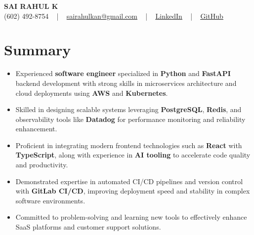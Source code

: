\documentclass[letterpaper,11pt]{article}
\newcommand{\resumeItem}[1]{
  \item\footnotesize{
    {#1 \vspace{-2pt}}
  }
}
\newcommand{\resumeItemListStart}{\begin{itemize}[leftmargin=*]}
\newcommand{\resumeItemListEnd}{\end{itemize}\vspace{-5pt}}
\begin{document}
\begin{center}
    {\fontsize{14pt}{12pt}\selectfont \textbf{\MakeUppercase{Sai Rahul K}}}\\ \vspace{2pt}
    \fontsize{10pt}{12pt}\selectfont (602) 492-8754 ~ | ~ \href{mailto:sairahulkan@gmail.com}{sairahulkan@gmail.com} ~ | ~
    \href{https://www.linkedin.com/in/rq123/}{\color{blue}\underline{LinkedIn}} ~ | ~
    \href{https://github.com/kanrahuldo}{\color{blue}\underline{GitHub}}~
    \vspace{-8pt}
\end{center}

\section{Summary}
\fontsize{9pt}{10pt}\selectfont
\resumeItemListStart
    \resumeItem{Experienced \textbf{software engineer} specialized in \textbf{Python} and \textbf{FastAPI} backend development with strong skills in microservices architecture and cloud deployments using \textbf{AWS} and \textbf{Kubernetes}.}
    \resumeItem{Skilled in designing scalable systems leveraging \textbf{PostgreSQL}, \textbf{Redis}, and observability tools like \textbf{Datadog} for performance monitoring and reliability enhancement.}
    \resumeItem{Proficient in integrating modern frontend technologies such as \textbf{React} with \textbf{TypeScript}, along with experience in \textbf{AI tooling} to accelerate code quality and productivity.}
    \resumeItem{Demonstrated expertise in automated CI/CD pipelines and version control with \textbf{GitLab CI/CD}, improving deployment speed and stability in complex software environments.}
    \resumeItem{Committed to problem-solving and learning new tools to effectively enhance SaaS platforms and customer support solutions.}
\resumeItemListEnd
\vspace{-6pt}
\end{document}

